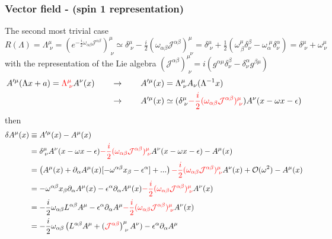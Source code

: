 \documentclass[10pt,a4paper]{report}
\theoremstyle{definition}
\begin{document}
\subsubsection{Vector field - (spin 1 representation)}
The second most trivial case $R(\Lambda)=\Lambda^\mu_{\;\nu}=\left(e^{-\frac{i}{2}\omega_{\alpha\beta}\mathcal{J}^{\alpha\beta}}\right)^\mu_{\;\nu}\simeq\delta^\mu_{\;\nu}-\frac{i}{2}(\omega_{\alpha\beta}\mathcal{J}^{\alpha\beta})^\mu_{\;\nu}=\delta^\mu_{\;\nu}+\frac{1}{2}(\omega^\mu_{\,\beta}\delta^\beta_\nu-\omega_\alpha^{\;\mu}\delta^\alpha_\nu)=\delta^\mu_{\;\nu}+\omega^\mu_{\,\nu}$ with the representation of the Lie algebra $(\mathcal{J}^{\alpha\beta})^\mu_{\;\nu}=i(g^{\alpha\mu}\delta^\beta_\nu-\delta^\alpha_\nu g^{\beta\mu})$
\begin{align}
A'^\mu(\Lambda x+a)=\textcolor{red}{\Lambda^\mu_{\;\nu}}A^\nu(x)\qquad&\rightarrow\qquad A'^\mu(x)=\Lambda^\mu_{\;\nu}A_\nu(\Lambda^{-1}x)\\
\qquad&\rightarrow\qquad A'^\mu(x)\simeq (\delta^\mu_{\;\nu}\textcolor{red}{-\frac{i}{2}(\omega_{\alpha\beta}\mathcal{J}^{\alpha\beta})^\mu_{\;\nu}})A^\nu(x-\omega x-\epsilon)
\end{align}
then
\begin{align}
\delta A^\mu(x)
&\equiv A'^\mu(x)-A^\mu(x)\\
&=\delta^\mu_{\;\nu}A^\nu(x-\omega x-\epsilon)\textcolor{red}{-\frac{i}{2}(\omega_{\alpha\beta}\mathcal{J}^{\alpha\beta})^\mu_{\;\nu}}A^\nu(x-\omega x-\epsilon)-A^\mu(x)\\
&=\left(A^\mu(x)+\partial_\alpha A^\mu(x)[-\omega^{\alpha\beta}x_\beta-\epsilon^\alpha]+...\right)\textcolor{red}{-\frac{i}{2}(\omega_{\alpha\beta}\mathcal{J}^{\alpha\beta})^\mu_{\;\nu}}A^\nu(x)+\mathcal{O}(\omega^2)-A^\mu(x)\\
&=-\omega^{\alpha\beta}x_\beta\partial_\alpha A^\mu(x)-\epsilon^\alpha\partial_\alpha A^\mu(x)\textcolor{red}{-\frac{i}{2}(\omega_{\alpha\beta}\mathcal{J}^{\alpha\beta})^\mu_{\;\nu}}A^\nu(x)\\
&=-\frac{i}{2}\omega_{\alpha\beta}L^{\alpha\beta} A^\mu-\epsilon^\alpha\partial_\alpha A^\mu\textcolor{red}{-\frac{i}{2}(\omega_{\alpha\beta}\mathcal{J}^{\alpha\beta})^\mu_{\;\nu}}A^\nu(x)\\
&=-\frac{i}{2}\omega_{\alpha\beta}\left(L^{\alpha\beta}A^\mu+(\textcolor{red}{\mathcal{J}^{\alpha\beta}}\right)^\mu_{\;\nu} A^\nu)-\epsilon^\alpha\partial_\alpha A^\mu
\end{align}
\end{document}
